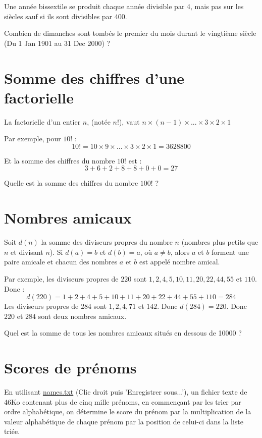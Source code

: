 Une année bissextile se produit chaque année divisible par 4, mais pas sur les siècles sauf si ils sont divisibles par 400. 

Combien de dimanches sont tombés le premier du mois durant le vingtième siècle (Du 1 Jan 1901 au 31 Dec 2000) ?

\newpage


\section{Somme des chiffres d'une factorielle} \label{pb.020}
La factorielle d'un entier $n$, (notée $n!$), vaut $n \times (n-1) \times ... \times 3 \times 2 \times 1$

Par exemple, pour $10!$ :
$$10!= 10 \times 9 \times ... \times 3 \times 2 \times 1 = 3628800$$

Et la somme des chiffres du nombre $10!$ est :
$$3 + 6 + 2 + 8 + 8 + 0 + 0 = 27$$

Quelle est la somme des chiffres du nombre $100!$ ?


\section{Nombres amicaux} \label{pb.021}
Soit $d(n)$ la somme des diviseurs propres du nombre $n$ (nombres plus petits que $n$ et divisant $n$).
Si $d(a) = b$ et $d(b) = a$, où $a \neq b$, alors $a$ et $b$ forment une paire amicale et chacun des nombres $a$ et $b$ est appelé nombre amical.

Par exemple, les diviseurs propres de $220$ sont $1, 2, 4, 5, 10, 11, 20, 22, 44, 55$ et $110$. Donc :
$$d(220) = 1+2+4+5+10+11+20+22+44+55+110 = 284$$
Les diviseurs propres de $284$ sont $1, 2, 4, 71$ et $142$. Donc $d(284) = 220$.
Donc $220$ et $284$ sont deux nombres amicaux.

Quel est la somme de tous les nombres amicaux situés en dessous de 10000 ?


\section{Scores de prénoms} \label{pb.022}
En utilisant \href{https://projecteuler.net/project/resources/p022_names.txt}{names.txt} (Clic droit puis 'Enregistrer sous...'), un fichier texte de 46Ko contenant plus de cinq mille prénoms, en commençant par les trier par ordre alphabétique, on détermine le score du prénom par la multiplication de la valeur alphabétique de chaque prénom par la position de celui-ci dans la liste triée.

